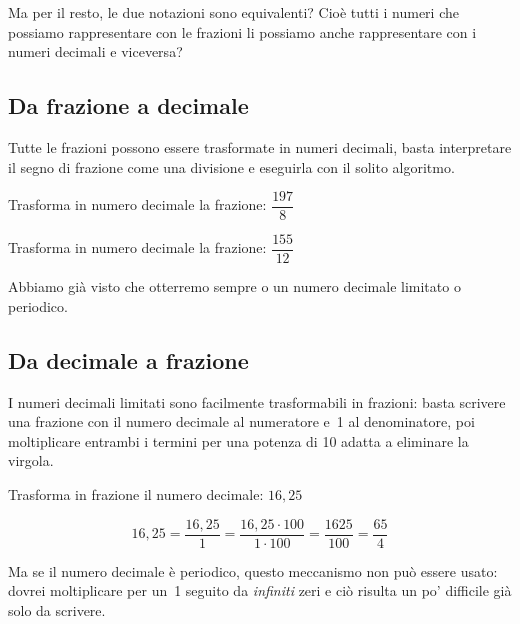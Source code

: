 Ma per il resto, le due notazioni sono equivalenti? Cioè tutti i numeri che 
possiamo rappresentare con le frazioni li possiamo anche rappresentare con 
i numeri decimali e viceversa?

\subsection{Da frazione a decimale}

Tutte le frazioni possono essere trasformate in numeri decimali, basta 
interpretare il segno di frazione come una divisione e eseguirla con il 
solito algoritmo.

\begin{esempio}{}{}
Trasforma in numero decimale la frazione: \(\dfrac{197}{8}\)
{\frazdeca}
\end{esempio}

\begin{esempio}{}{}
Trasforma in numero decimale la frazione: \(\dfrac{155}{12}\)
{\frazdecb}
\end{esempio}

Abbiamo già visto che otterremo sempre o un numero decimale limitato o 
periodico.

\subsection{Da decimale a frazione}

I numeri decimali limitati sono facilmente trasformabili in frazioni: basta 
scrivere una frazione con il numero decimale al numeratore e~1 al 
denominatore, 
poi moltiplicare entrambi i termini per una potenza di 10 adatta a 
eliminare la virgola.

\begin{esempio}{}{}
Trasforma in frazione il numero decimale: \(16,25\)
\begin{center}
 \[16,25 = \frac{16,25}{1} = \frac{16,25 \cdot 100}{1 \cdot 100} =
   \frac{1625}{100} = \frac{65}{4}\]
\end{center}
\end{esempio}

Ma se il numero decimale è periodico, questo meccanismo non può essere 
usato: dovrei moltiplicare per un~1 seguito da \emph{infiniti} zeri e ciò 
risulta un po' difficile già solo da scrivere.

